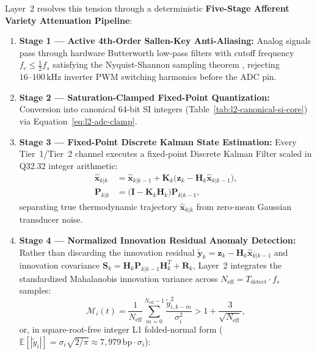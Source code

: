 Layer~2 resolves this tension through a deterministic \textbf{Five-Stage Afferent Variety Attenuation Pipeline}:
\begin{enumerate}
    \item \textbf{Stage 1 --- Active 4th-Order Sallen-Key Anti-Aliasing:} Analog signals pass through hardware Butterworth low-pass filters with cutoff frequency $f_c \le \frac{1}{2} f_s$ satisfying the Nyquist-Shannon sampling theorem \parencite{nyquist1928,shannon1948}, rejecting $16\text{--}100\,\mathrm{kHz}$ inverter PWM switching harmonics before the ADC pin.
    \item \textbf{Stage 2 --- Saturation-Clamped Fixed-Point Quantization:} Conversion into canonical 64-bit SI integers (Table~\ref{tab:l2-canonical-si-core}) via Equation~\eqref{eq:l2-adc-clamp}.
    \item \textbf{Stage 3 --- Fixed-Point Discrete Kalman State Estimation:} Every Tier~1/Tier~2 channel executes a fixed-point Discrete Kalman Filter \parencite{kalman1960,grewal2014kalman} scaled in Q32.32 integer arithmetic:
    \begin{align}
        \hat{\mathbf{x}}_{k|k} &= \hat{\mathbf{x}}_{k|k-1} + \mathbf{K}_k \bigl(\mathbf{z}_k - \mathbf{H}_k \hat{\mathbf{x}}_{k|k-1}\bigr), \label{eq:l2-kalman-update}\\
        \mathbf{P}_{k|k} &= \bigl(\mathbf{I} - \mathbf{K}_k \mathbf{H}_k\bigr)\mathbf{P}_{k|k-1}, \label{eq:l2-kalman-cov}
    \end{align}
    separating true thermodynamic trajectory $\hat{\mathbf{x}}_{k|k}$ from zero-mean Gaussian transducer noise.
    \item \textbf{Stage 4 --- Normalized Innovation Residual Anomaly Detection:} Rather than discarding the innovation residual $\tilde{\mathbf{y}}_k = \mathbf{z}_k - \mathbf{H}_k \hat{\mathbf{x}}_{k|k-1}$ and innovation covariance $\mathbf{S}_k = \mathbf{H}_k \mathbf{P}_{k|k-1} \mathbf{H}_k^T + \mathbf{R}_k$, Layer~2 integrates the standardized Mahalanobis innovation variance across $N_{\mathrm{eff}} = T_{\mathrm{detect}} \cdot f_s$ samples:
    \begin{equation}
        \mathcal{M}_i(t) = \frac{1}{N_{\mathrm{eff}}} \sum_{m=0}^{N_{\mathrm{eff}}-1} \frac{\tilde{y}_{i,k-m}^2}{\sigma_i^2} > 1 + \frac{3}{\sqrt{N_{\mathrm{eff}}}},
        \label{eq:l2-mahalanobis-anomaly}
    \end{equation}
    or, in square-root-free integer L1 folded-normal form ($\mathbb{E}[|\tilde{y}_i|] = \sigma_i\sqrt{2/\pi} \approx 7{,}979\,\mathrm{bp}\cdot\sigma_i$):

\end{enumerate}
